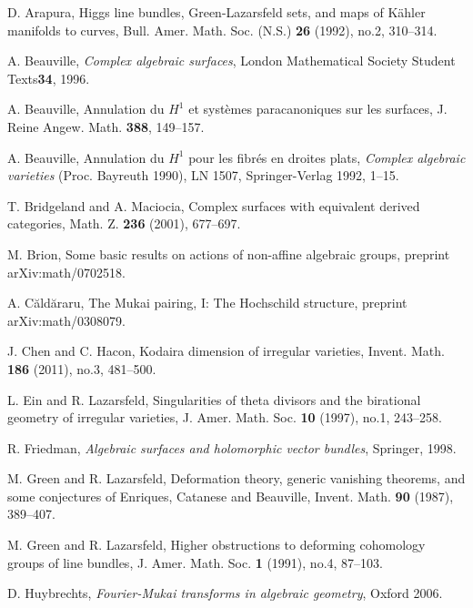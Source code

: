 \documentclass{amsart}
\theoremstyle{plain}
\theoremstyle{definition}
\numberwithin{equation}{section}
\begin{document}
\begin{thebibliography}{EMS}

D. Arapura, {Higgs line bundles, Green-Lazarsfeld sets, and maps of K\"ahler manifolds to curves}, Bull. Amer. Math. Soc. (N.S.)
\textbf{26} (1992), no.2, 310--314.

A. Beauville, \emph{Complex algebraic surfaces}, London Mathematical Society Student Texts\textbf{34}, 1996.

A. Beauville, {Annulation du $H^1$ et syst\`emes paracanoniques sur
les surfaces}, J. Reine Angew. Math. \textbf{388}, 149--157.

A. Beauville, { Annulation du $H^1$ pour les fibr\'es en droites plats},  \emph{Complex algebraic varieties} (Proc. Bayreuth 1990), LN 1507,  Springer-Verlag 1992, 1--15. 

T. Bridgeland and A. Maciocia, {Complex surfaces with equivalent derived categories}, Math. Z. \textbf{236} (2001), 677--697.

M. Brion, {Some basic results on actions of non-affine algebraic groups}, preprint 
arXiv:math/0702518.

A. C\u ald\u araru, {The Mukai pairing, I: The Hochschild structure}, preprint arXiv:math/0308079.

J. Chen and  C. Hacon, {Kodaira dimension of irregular varieties}, 
Invent. Math. \textbf{186} (2011), no.3,  481--500.

L. Ein and R. Lazarsfeld, {Singularities of theta divisors and the birational geometry of irregular varieties}, J. Amer. Math. Soc. \textbf{10} (1997), no.1, 243--258.

R. Friedman, \emph{Algebraic surfaces and holomorphic vector bundles}, Springer, 1998.

M. Green and R. Lazarsfeld, {Deformation theory, generic vanishing
theorems, and some conjectures of Enriques, Catanese and Beauville},
Invent. Math. \textbf{90} (1987), 389--407.

M. Green and R. Lazarsfeld, {Higher obstructions to deforming
cohomology groups of line bundles}, J. Amer. Math. Soc. \textbf{1}
(1991), no.4, 87--103.

D. Huybrechts, \emph{Fourier-Mukai transforms in algebraic geometry}, Oxford 2006.


\end{thebibliography}
\end{document}
